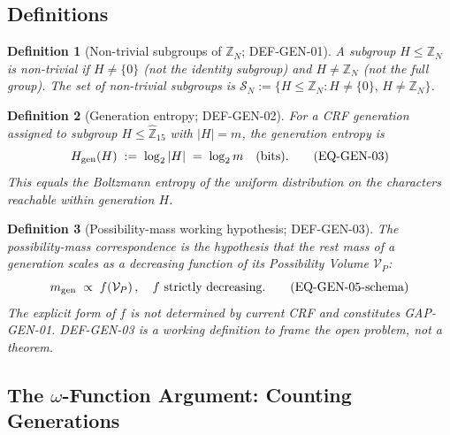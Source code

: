 \documentclass[12pt, a4paper]{article}
\newtheorem{definition}{Definition}[section]
\begin{document}
\subsection{Definitions}
\label{zc15:sec:defs}

\begin{definition}[Non-trivial subgroups of $\mathbb{Z}_N$;
  DEF-GEN-01]
\label{zc15:def:nontrivial}
A subgroup $H \leq \mathbb{Z}_N$ is \emph{non-trivial} if
$H \neq \{0\}$ (not the identity subgroup) and $H \neq \mathbb{Z}_N$
(not the full group). The set of non-trivial subgroups is
$\mathcal{S}_N := \{H \leq \mathbb{Z}_N : H \neq \{0\},\,
H \neq \mathbb{Z}_N\}$.
\end{definition}

\begin{definition}[Generation entropy; DEF-GEN-02]
\label{zc15:def:gen-entropy}
For a CRF generation assigned to subgroup $H \leq
\widehat{\mathbb{Z}}_{15}$ with $|H| = m$, the
\emph{generation entropy} is
\begin{equation}
  H_{\rm gen}(H) \;:=\; \log_2 |H| \;=\; \log_2 m \quad
  \text{(bits).}
  \tag{EQ-GEN-03}\label{zc15:eq:gen-entropy}
\end{equation}
This equals the Boltzmann entropy of the uniform distribution
on the characters reachable within generation $H$.
\end{definition}

\begin{definition}[Possibility-mass working hypothesis;
  DEF-GEN-03]
\label{zc15:def:vp-mass}
The \emph{possibility-mass correspondence} is the hypothesis that
the rest mass of a generation scales as a decreasing function of
its Possibility Volume $\mathcal{V}_P$:
\begin{equation}
  m_{\rm gen} \;\propto\; f\!\left(\mathcal{V}_P\right),
  \quad f \text{ strictly decreasing.}
  \tag{EQ-GEN-05-schema}\label{zc15:eq:vp-mass-schema}
\end{equation}
The explicit form of $f$ is not determined by current CRF and
constitutes GAP-GEN-01. DEF-GEN-03 is a \emph{working definition}
to frame the open problem, not a theorem.
\end{definition}

\subsection{The $\omega$-Function Argument: Counting Generations}
\label{zc15:sec:counting}
\end{document}
